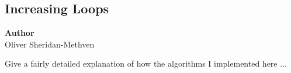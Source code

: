 \subsection{Increasing Loops}
\label{subsec:increasing_loops}

\begin{flushright}
	\textbf{Author} \\
		Oliver Sheridan-Methven
\end{flushright}

Give a fairly detailed explanation of how the algorithms I implemented here ... 

